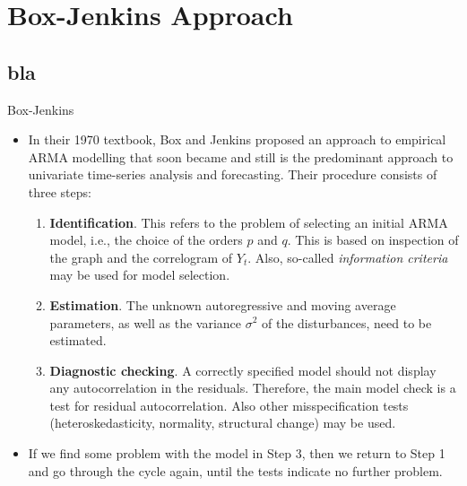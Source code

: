\section{Box-Jenkins Approach}\subsection*{bla}
\begin{frame}{Box-Jenkins}
\begin{itemize}
\item In their 1970 textbook, Box and Jenkins proposed an approach to empirical
ARMA modelling that soon became and still is the predominant approach to
univariate time-series analysis and forecasting. Their procedure consists of
three steps:

\begin{enumerate}
\item \textbf{\color{blue}Identification}. This refers to the problem of
selecting an initial ARMA model, i.e., the choice of the orders $p$
and $q$. This is based on inspection of the
graph and the correlogram of $Y_{t}$. Also,
so-called \emph{\color{red}information criteria} may be used for model
selection.

\item \textbf{\color{blue}Estimation}. The unknown autoregressive and moving
average parameters, as well as the variance $\sigma ^{2}$ of the
disturbances, need to be estimated.

\item \textbf{\color{blue}Diagnostic checking}. A correctly specified model
should not display any autocorrelation in the residuals. Therefore, the main
model check is a test for residual autocorrelation. Also other
misspecification tests (heteroskedasticity, normality, structural change)
may be used.
\end{enumerate}

\item If we find some problem with the model in Step 3, then we return to
Step 1 and go through the cycle again, until the tests indicate no further
problem.
\end{itemize}
\end{frame}
